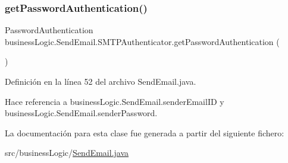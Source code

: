 \subsubsection{\texorpdfstring{getPasswordAuthentication()}{getPasswordAuthentication()}}
{\footnotesize\ttfamily Password\+Authentication business\+Logic.\+Send\+Email.\+S\+M\+T\+P\+Authenticator.\+get\+Password\+Authentication (\begin{DoxyParamCaption}{ }\end{DoxyParamCaption})}



Definición en la línea 52 del archivo Send\+Email.\+java.


\begin{DoxyCode}{0}

\end{DoxyCode}


Hace referencia a business\+Logic.\+Send\+Email.\+sender\+Email\+ID y business\+Logic.\+Send\+Email.\+sender\+Password.



La documentación para esta clase fue generada a partir del siguiente fichero\+:\begin{DoxyCompactItemize}
\item 
src/business\+Logic/\mbox{\hyperlink{_send_email_8java}{Send\+Email.\+java}}\end{DoxyCompactItemize}
